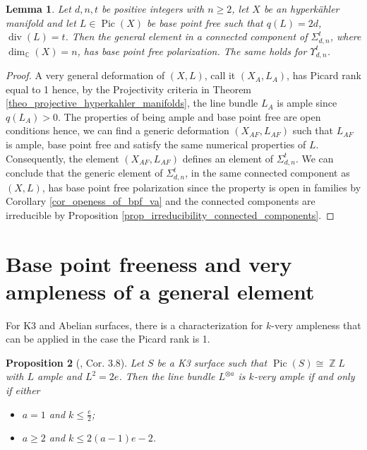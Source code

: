 \documentclass{article}
\DeclareMathOperator{\bC}{\mathbb{C}}
\DeclareMathOperator{\bZ}{\mathbb{Z}}
\DeclareMathOperator{\Pic}{Pic}
\DeclareMathOperator{\Div}{div}
\newtheorem{proposition}{Proposition}[section]
\newtheorem{lemma}[proposition]{Lemma}
\begin{document}
\begin{lemma}\label{lemma_bfp_does_not_require_ampleness}
Let $d,n,t$ be positive integers with $n\geq 2$, let $X$ be an hyperk\"ahler manifold and let $L\in \Pic(X)$ be base point free such that $q(L)=2d$, $\Div(L)=t$. Then the general element in a connected component of $\Sigma_{d,n}^t$, where $\dim_{\bC}(X)=n$,  has base point free polarization. The same holds for $\Upsilon_{d,n}^t$.
\end{lemma}
\begin{proof}
    A very general deformation of $(X,L)$, call it $(X_A,L_A)$, has Picard rank equal to 1 hence, by the Projectivity criteria in Theorem \ref{theo_projective_hyperkahler_manifolds}, the line bundle $L_A$ is ample since $q(L_A)>0$. The properties of being ample and base point free are open conditions hence, we can find a generic deformation $(X_{AF},L_{AF})$ such that $L_{AF}$ is ample, base point free and satisfy the same numerical properties of $L$. Consequently, the element $(X_{AF},L_{AF})$ defines an element of $\Sigma_{d,n}^t$. We can conclude that the generic element of $\Sigma_{d,n}^t$, in the same connected component as $(X,L)$, has base point free polarization since the property is open in families by Corollary \ref{cor_openess_of_bpf_va} and the connected components are irreducible by Proposition \ref{prop_irreducibility_connected_components}.
\end{proof}


\section{Base point freeness and very ampleness of a general element}\label{sect_main_theorems}

For K3 and Abelian surfaces, there is a characterization for $k$-very ampleness that can be applied in the case the Picard rank is 1.

\begin{proposition}[\cite{debarre2020hyperkahlermanifolds}, Cor. 3.8]\label{prop_k_very_ample_k3}
Let $S$ be a K3 surface such that $\Pic(S)\cong\bZ L$ with $L$ ample and $L^2=2e$. Then the line bundle $L^{\otimes a}$ is $k$-very ample if and only if either
\begin{itemize}
    \item $a=1$ and $k\leq \frac{e}{2}$;
    \item $a\geq 2$ and $k\leq 2(a-1)e-2$.
\end{itemize}
\end{proposition}
\end{document}
